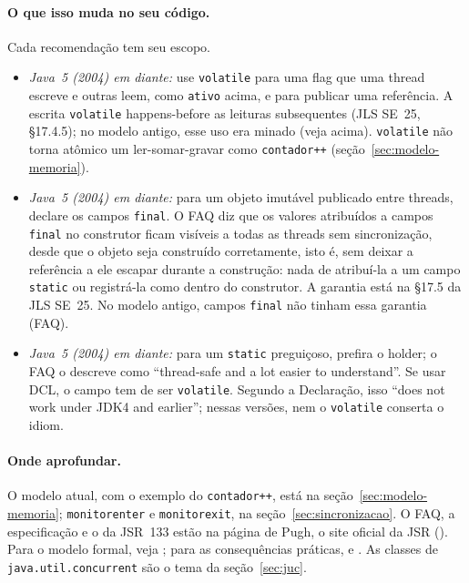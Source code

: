 \paragraph{O que isso muda no seu código.}
Cada recomendação tem seu escopo.
\begin{itemize}
\item \emph{Java~5 (2004) em diante:} use \texttt{volatile} para uma
  flag que uma thread escreve e outras leem, como \texttt{ativo} acima,
  e para publicar uma referência. A escrita \texttt{volatile}
  happens-before as leituras subsequentes (JLS SE~25, §17.4.5); no
  modelo antigo, esse uso era minado (veja acima). \texttt{volatile}
  não
  torna atômico um ler-somar-gravar como \texttt{contador++}
  (seção~\ref{sec:modelo-memoria}).
\item \emph{Java~5 (2004) em diante:} para um objeto imutável
  publicado entre threads, declare os campos \texttt{final}. O FAQ diz
  que os valores atribuídos a campos \texttt{final} no construtor ficam
  visíveis a todas as threads sem sincronização, desde que o objeto
  seja construído corretamente, isto é, sem deixar a referência a ele
  escapar durante a construção: nada de atribuí-la a um campo
  \texttt{static} ou registrá-la como  dentro do construtor. A
  garantia está na §17.5 da JLS SE~25. No modelo antigo, campos
  \texttt{final} não tinham essa garantia (FAQ).
\item \emph{Java~5 (2004) em diante:} para um
  \texttt{static} preguiçoso, prefira o holder; o FAQ o descreve como
  \enquote{thread-safe and a lot easier to understand}. Se usar DCL, o
  campo tem de ser \texttt{volatile}. Segundo a Declaração, isso
  \enquote{does not work under JDK4 and earlier}; nessas versões, nem
  o \texttt{volatile} conserta o idiom.
\end{itemize}

\paragraph{Onde aprofundar.}
O modelo atual, com o exemplo do \texttt{contador++}, está na
seção~\ref{sec:modelo-memoria}; \texttt{monitorenter} e
\texttt{monitorexit}, na seção~\ref{sec:sincronizacao}. O FAQ, a
especificação e o  da JSR~133 estão na página de Pugh, o site
oficial da JSR (). Para o modelo
formal, veja ; para as consequências
práticas,  e .
As classes de \texttt{java.util.concurrent} são o tema da
seção~\ref{sec:juc}.
